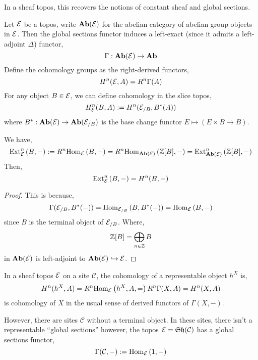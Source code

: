 \documentclass[12pt]{article}
\renewcommand{\C}{\mathcal{C}}
\begin{document}
\begin{rmk}
In a sheaf topos, this recovers the notions of constant sheaf and global sections.
\end{rmk}

\begin{defn}
Let $\mathcal{E}$ be a topos, write $\mathbf{Ab}(\mathcal{E})$ for the abelian category of abelian group objects in $\mathcal{E}$. Then the global sections functor induces a left-exact (since it admits a left-adjoint $\Delta$) functor,
\[ \Gamma : \mathbf{Ab}(\mathcal{E}) \to \mathbf{Ab} \]
Define the cohomology groups as the right-derived functors,
\[ H^n(\mathcal{E}, A) = R^n \Gamma(A) \]
For any object $B \in \mathcal{E}$, we can define cohomology in the slice topos,
\[ H^n_{\mathcal{E}}(B, A) := H^n(\mathcal{E}_{/B}, B^*(A)) \]
where $B^* : \mathbf{Ab}(\mathcal{E}) \to \mathbf{Ab}(\mathcal{E}_{/B})$ is the base change functor $E \mapsto (E \times B \to B)$. 
\end{defn}

\begin{prop}
We have,
\[ \mathrm{Ext}^{n}_{\mathcal{E}} \left( B, - \right) := R^n \mathrm{Hom}_{\mathcal{E}} \left( B, - \right) = R^n \mathrm{Hom}_{\mathbf{Ab}(\mathcal{E})} \left( \mathbb{Z}[B], - \right) = \mathrm{Ext}^{n}_{\mathbf{Ab}(\mathcal{E})} \left( \mathbb{Z}[B], - \right) \]
Then,
\[ \mathrm{Ext}^{n}_{\mathcal{E}} \left( B, - \right) = H^n(B, -) \]
\end{prop}

\begin{proof}
This is because,
\[ \Gamma(\mathcal{E}_{/B}, B^*(-)) = \mathrm{Hom}_{\mathcal{E}_{/B}} \left( B, B^*(-) \right) = \mathrm{Hom}_{\mathcal{E}} \left( B, - \right) \]
since $B$ is the terminal object of $\mathcal{E}_{/B}$. Where,
\[ \mathbb{Z}[B] = \bigoplus_{n \in \mathbb{Z}} B \]
in $\mathbf{Ab}(\mathcal{E})$ is left-adjoint to $\mathbf{Ab}(\mathcal{E}) \hookrightarrow \mathcal{E}$.
\end{proof}

\begin{example}
In a sheaf topos $\mathcal{E}$ on a site $\C$, the cohomology of a representable object $h^X$ is,
\[ H^n(h^X, A) = R^n \mathrm{Hom}_{\mathcal{E}} \left( h^X, A, = \right) R^n \Gamma(X, A) = H^n(X, A) \]
is cohomology of $X$ in the usual sense of derived functors of $\Gamma(X, -)$. 
\end{example}

\begin{rmk}
However, there are sites $\C$ without a terminal object. In these sites, there isn't a representable ``global sections'' however, the topos $\E = \Sh(\C)$ has a global sections functor,
\[ \Gamma(\C, -) := \Hom{\E}{1}{-} \]
\end{rmk}
\end{document}
